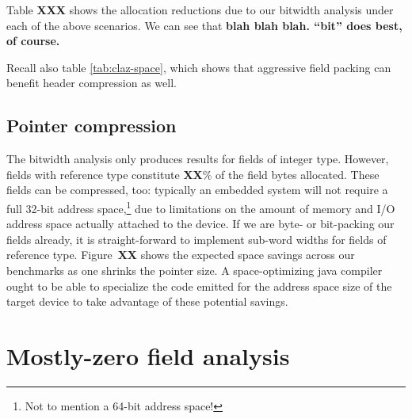 \documentclass[preprint]{acmconf}
\begin{document}
Table {\bf XXX} shows the allocation reductions due to our bitwidth
analysis under each of the above scenarios.  We can see that {\bf blah
  blah blah.  ``bit'' does best, of course.}

Recall also table \ref{tab:claz-space}, which shows that aggressive
field packing can benefit header compression as well.

\subsection{Pointer compression}\label{sec:ptrcmp}
The bitwidth analysis only produces results for fields of integer type.
However, fields with reference type constitute {\bf XX}\% of
the field bytes allocated.  These fields can be compressed, too:
typically an embedded system will not require a full 32-bit address
space,\footnote{Not to mention a 64-bit address space!} due to
limitations on the amount of memory and I/O address space actually attached
to the device.  If we are byte- or bit-packing our fields already,
it is straight-forward to implement sub-word widths for fields of
reference type.  Figure~{\bf XX} shows the expected space savings
across our benchmarks as one shrinks the pointer size.  A
space-optimizing java compiler ought to be able to specialize the code
emitted for the address space size of the target device to take
advantage of these potential savings.

\section{Mostly-zero field analysis}
\end{document}
